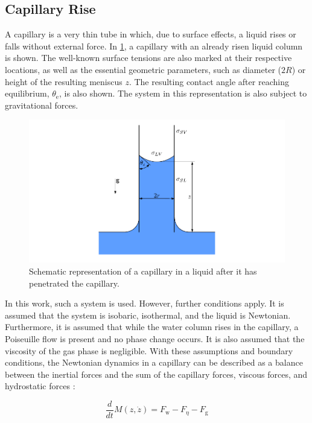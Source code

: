 \subsection{Capillary Rise}
\label{sec: capillaryRise}
A capillary is a very thin tube in which, due to surface effects, a liquid rises or falls without external force. In \ref{fig: classicCapillary}, a capillary with an already risen liquid column is shown. The well-known surface tensions are also marked at their respective locations, as well as the essential geometric parameters, such as diameter ($2R$) or height of the resulting meniscus $z$. The resulting contact angle after reaching equilibrium, $\theta_{\mathrm{e}}$, is also shown. The system in this representation is also subject to gravitational forces.

\begin{figure}[h]
    \centering
    \includegraphics[width=.95\textwidth]{Pictures/classicCapillary.pdf}
    \caption{Schematic representation of a capillary in a liquid after it has penetrated the capillary.}
    \label{fig: classicCapillary}
\end{figure}

In this work, such a system is used. However, further conditions apply. It is assumed that the system is isobaric, isothermal, and the liquid is Newtonian. Furthermore, it is assumed that while the water column rises in the capillary, a Poiseuille flow is present and no phase change occurs. It is also assumed that the viscosity of the gas phase is negligible. With these assumptions and boundary conditions, the Newtonian dynamics in a capillary can be described as a balance between the inertial forces and the sum of the capillary forces, viscous forces, and hydrostatic forces \cite{fricke2023AnalyticalStudyCapillary}:

\begin{equation}
\label{eq: NewtonBalanceForcesOnly}
    \frac{d}{dt}M(z,\dot{z}) = F_{\mathrm{w}} - F_{\eta} - F_{\mathrm{g}}
\end{equation}

